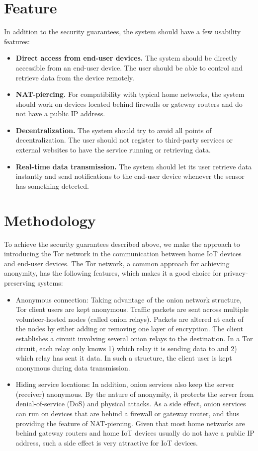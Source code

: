 \section{Feature}
In addition to the security guarantees, the system should have a few usability features:

\begin{itemize}
	\item \textbf{Direct access from end-user devices.} The system should be directly accessible from an end-user device. The user should be able to control and retrieve data from the device remotely. 
	\item \textbf{NAT-piercing.}  For compatibility with typical home networks, the system should work on devices located behind firewalls or gateway routers and do not have a public IP address.
	\item \textbf{Decentralization.} The system should try to avoid all points of decentralization. The user should not register to third-party services or external websites to have the service running or retrieving data.
	\item \textbf{Real-time data transmission.} The system should let its user retrieve data instantly and send notifications to the end-user device whenever the sensor has something detected.
\end{itemize}



\section{Methodology}
To achieve the security guarantees described above, we make the approach to introducing the Tor network in the communication between home IoT devices and end-user devices. The Tor network, a common approach for achieving anonymity\cite{dingledine2004tor}, has the following features, which makes it a good choice for privacy-preserving systems:

\begin{itemize}
	\item Anonymous connection: Taking advantage of the onion network structure, Tor client users are kept anonymous. Traffic packets are sent across multiple volunteer-hosted nodes (called onion relays). Packets are altered at each of the nodes by either adding or removing one layer of encryption. The client establishes a circuit involving several onion relays to the destination. In a Tor circuit, each relay only knows 1) which relay it is sending data to and 2) which relay has sent it data. In such a structure, the client user is kept anonymous during data transmission. 
	\item Hiding service locations: In addition, onion services also keep the server (receiver) anonymous. By the nature of anonymity, it protects the server from denial-of-service (DoS) and physical attacks. As a side effect, onion services can run on devices that are behind a firewall or gateway router, and thus providing the feature of NAT-piercing. Given that most home networks are behind gateway routers and home IoT devices usually do not have a public IP address, such a side effect is very attractive for IoT devices.
\end{itemize}